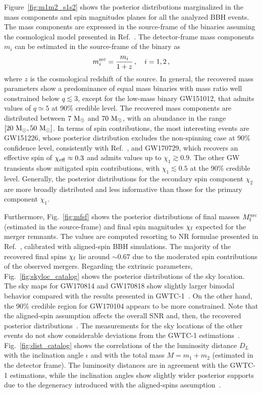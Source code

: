 \documentclass[prd,aps,twocolumn,a4paper,showkeys,nofootinbib,floatfix]{revtex4-1}
\newcommand{\be}{\begin{equation}}
\newcommand{\ee}{\end{equation}}
\def\Mo{{\rm M_{\odot}}}
\begin{document}
Figure~\ref{fig:m1m2_s1s2} shows the posterior distributions 
marginalized in the mass components and spin magnitudes planes
for all the analyzed BBH events.
The mass components are expressed in the source-frame 
of the binaries assuming the cosmological model 
presented in Ref.~\cite{Aghanim:2018eyx}.
The detector-frame mass components $m_i$ can be 
estimated in the source-frame of the binary as
\be
\label{eq:srcmass}
m_i^{\rm src} = \frac{m_i}{1+z}\,,\quad i=1,2\,,
\ee
where $z$ is the cosmological redshift of the source.
In general, the recovered mass parameters
show a predominance of equal mass binaries with
mass ratio well constrained below $q\lesssim 3$,
except for the low-mass binary GW151012,
that admits values of $q\simeq 5$ at 90\% credible level.
The recovered mass components are distributed between $7~\Mo$
and $70~\Mo$, with an abundance in the range $[20~\Mo,50~\Mo]$.
In terms of spin contributions, 
the most interesting events are GW151226,
whose posterior distribution excludes the non-spinning case at 90\%
confidence level, consistently with Ref.~\cite{LIGOScientific:2018mvr,Schmidt:2020yuu},
and GW170729, which recovers an effective spin of $\chi_{\rm eff}\approx{0.3}$ and admits 
values up to $\chi_1\gtrsim 0.9$.                                    
The other GW transients show mitigated spin contributions,
with $\chi_1 \lesssim 0.5$ at the 90\% credible level.
Generally, the posterior distributions for the secondary spin component 
$\chi_2$ are more broadly distributed and less informative 
than those for the primary component $\chi_1$.

Furthermore, 
Fig.~\ref{fig:mfsf} shows the posterior distributions of final masses 
$M_{\rm f}^{\rm src}$ (estimated in the source-frame)
and final spin magnitudes $\chi_{\rm f}$ 
expected for the merger remnants. 
The values are
computed resorting to NR formulae presented in Ref.~\cite{Jimenez-Forteza:2016oae},
calibrated with aligned-spin BBH simulations. 
The majority of the recovered final spins $\chi_{\rm f}$ lie 
around ${\sim}0.67$ due to the moderated spin contributions 
of the observed mergers.
Regarding the extrinsic parameters, 
Fig.~\ref{fig:skyloc_catalog} shows 
the posterior distributions of the sky location.
The sky maps for GW170814 and GW170818
show slightly larger bimodal behavior compared with the
results presented in GWTC-1~\cite{LIGOScientific:2018mvr}.
On the other hand, the 90\% credible region for GW170104 appears to be 
more constrained.
Note that the aligned-spin assumption affects
the overall SNR and, then, the recovered posterior distributions~\cite{Canton:2014ena,Canton:2014uja}.
The measurements for the sky locations of the other events
do not show considerable deviations from the 
GWTC-1 estimations~\cite{LIGOScientific:2018mvr}.
Fig.~\ref{fig:dist_catalog} shows the correlations of the
the luminosity distance $D_L$ with the inclination angle $\iota$
and with the total mass $M=m_1+m_2$ (estimated in the detector frame).
The luminosity distances are in agreement with the GWTC-1 estimations,
while the inclination angles show slightly  
wider posterior supports due to 
the degeneracy introduced with the aligned-spins assumption~\cite{PhysRevD.49.6274}.
\end{document}
